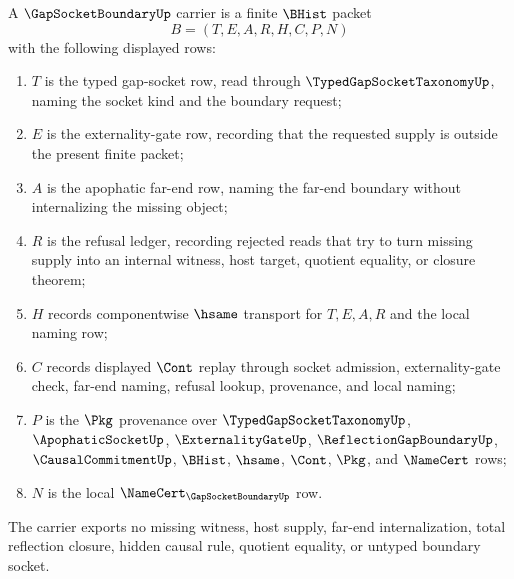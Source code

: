\begin{definition}
\label{def:gap-socket-boundary-carrier}
A $\GapSocketBoundaryUp$ carrier is a finite $\BHist$ packet
$$
B=(T,E,A,R,H,C,P,N)
$$
with the following displayed rows:
\begin{enumerate}
\item $T$ is the typed gap-socket row, read through $\TypedGapSocketTaxonomyUp$, naming the socket kind and the boundary request;
\item $E$ is the externality-gate row, recording that the requested supply is outside the present finite packet;
\item $A$ is the apophatic far-end row, naming the far-end boundary without internalizing the missing object;
\item $R$ is the refusal ledger, recording rejected reads that try to turn missing supply into an internal witness, host target, quotient equality, or closure theorem;
\item $H$ records componentwise $\hsame$ transport for $T,E,A,R$ and the local naming row;
\item $C$ records displayed $\Cont$ replay through socket admission, externality-gate check, far-end naming, refusal lookup, provenance, and local naming;
\item $P$ is the $\Pkg$ provenance over $\TypedGapSocketTaxonomyUp$, $\ApophaticSocketUp$, $\ExternalityGateUp$, $\ReflectionGapBoundaryUp$, $\CausalCommitmentUp$, $\BHist$, $\hsame$, $\Cont$, $\Pkg$, and $\NameCert$ rows;
\item $N$ is the local $\NameCert_{\GapSocketBoundaryUp}$ row.
\end{enumerate}
The carrier exports no missing witness, host supply, far-end internalization, total reflection closure, hidden causal rule, quotient equality, or untyped boundary socket.
\end{definition}

